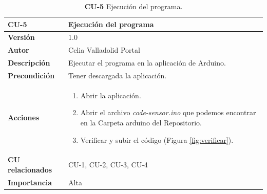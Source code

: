 \begin{table}[H]
	\centering
	\begin{tabularx}{\linewidth}{ p{} p{} }
		\toprule
            \rowcolor[HTML]{B0E0E6}
		\textbf{CU-5}    & \textbf{Ejecución del programa}\\
		\toprule
		\textbf{Versión}              & 1.0    \\
		\textbf{Autor}                & Celia Valladolid Portal \\
		\textbf{Descripción}          & Ejecutar el programa en la aplicación de Arduino.  \\
		\textbf{Precondición}         & Tener descargada la aplicación. \\
		\textbf{Acciones}             &
		\begin{enumerate}
			\def\labelenumi{\arabic{enumi}.}
			\tightlist
                \item Abrir la aplicación.
			\item Abrir el archivo \textit{code-sensor.ino} que podemos encontrar en la Carpeta arduino del Repositorio.
			\item Verificar y subir el código (Figura \ref{fig:verificar}).
		\end{enumerate}\\
		\textbf{CU relacionados}        & CU-1, CU-2, CU-3, CU-4 \\
		\textbf{Importancia}          & Alta  \\
		\bottomrule
	\end{tabularx}
	\caption{\textbf{CU-5} Ejecución del programa.}
        \label{tab:cu5}
\end{table}


